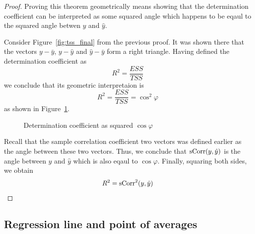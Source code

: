 \begin{proof}
Proving this theorem geometrically means showing that the determination coefficient can be interpreted as some squared angle
which happens to be eqaul to the squared angle betwen $y$ and $\hat y$.

Consider Figure~\ref{fig:tss_final} from the previous proof.
It was shown there that the vectors $y - \bar y$, $y - \hat y$ and $\hat y - \bar y$ form a right triangle.
Having defined the determination coefficient as
\[
R^2 = \frac{ESS}{TSS}
\]
we conclude that its geometric interpretaion is
\[
R^2 = \frac{ESS}{TSS} = \cos^2 \varphi
\]
as shown in Figure~\ref{fig:r_sq_angle}.

\begin{figure}
  \caption{Determination coefficient as squared $\cos \varphi$}
  \label{fig:r_sq_angle}
\end{figure}

Recall that the sample correlation coefficient two vectors was defined earlier as the angle between these two vectors.
Thus, we conclude that $\operatorname{sCorr}(y, \hat y)$ is the angle between $y$ and $\hat y$ which is also eqaul to $\cos \varphi$.
Finally, squaring both sides, we obtain
\[
R^2 = \operatorname{sCorr}^2(y, \hat y)
\]
\end{proof}

\subsection{Regression line and point of averages}

